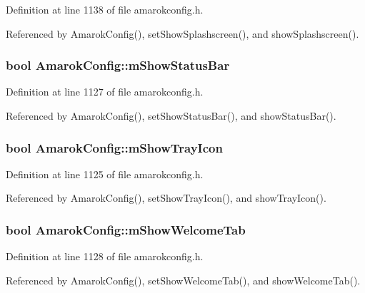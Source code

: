 Definition at line 1138 of file amarokconfig.h.

Referenced by Amarok\-Config(), set\-Show\-Splashscreen(), and show\-Splashscreen().
\subsubsection{\setlength{\rightskip}{0pt plus 5cm}bool {\bf Amarok\-Config::m\-Show\-Status\-Bar}\hspace{0.3cm}{\tt  [protected]}}\label{classAmarokConfig_AmarokConfigp13}




Definition at line 1127 of file amarokconfig.h.

Referenced by Amarok\-Config(), set\-Show\-Status\-Bar(), and show\-Status\-Bar().
\subsubsection{\setlength{\rightskip}{0pt plus 5cm}bool {\bf Amarok\-Config::m\-Show\-Tray\-Icon}\hspace{0.3cm}{\tt  [protected]}}\label{classAmarokConfig_AmarokConfigp11}




Definition at line 1125 of file amarokconfig.h.

Referenced by Amarok\-Config(), set\-Show\-Tray\-Icon(), and show\-Tray\-Icon().
\subsubsection{\setlength{\rightskip}{0pt plus 5cm}bool {\bf Amarok\-Config::m\-Show\-Welcome\-Tab}\hspace{0.3cm}{\tt  [protected]}}\label{classAmarokConfig_AmarokConfigp14}




Definition at line 1128 of file amarokconfig.h.

Referenced by Amarok\-Config(), set\-Show\-Welcome\-Tab(), and show\-Welcome\-Tab().
